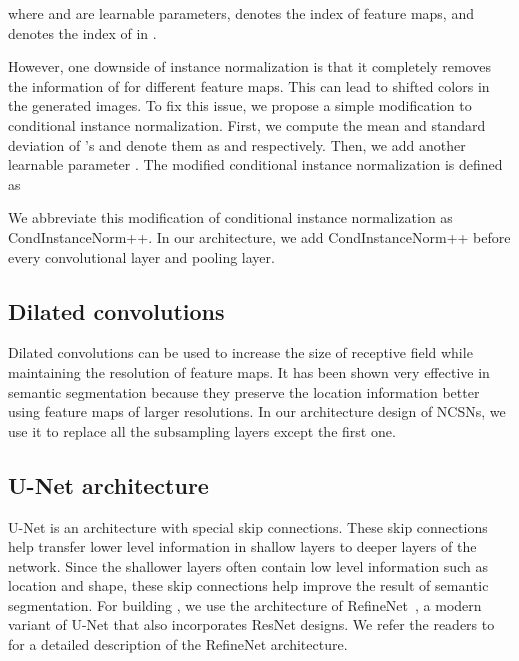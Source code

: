 \documentclass{article}
\begin{document}
where  and  are learnable parameters,  denotes the index of feature maps, and  denotes the index of  in . 

However, one downside of instance normalization is that it completely removes the information of  for different feature maps. This can lead to shifted colors in the generated images. To fix this issue, we propose a simple modification to conditional instance normalization. First, we compute the mean and standard deviation of 's and denote them as  and  respectively. Then, we add another learnable parameter . The modified conditional instance normalization is defined as

We abbreviate this modification of conditional instance normalization as CondInstanceNorm++. In our architecture, we add CondInstanceNorm++ before every convolutional layer and pooling layer.

\subsection{Dilated convolutions}
Dilated convolutions can be used to increase the size of receptive field while maintaining the resolution of feature maps. It has been shown very effective in semantic segmentation because they preserve the location information better using feature maps of larger resolutions. In our architecture design of NCSNs, we use it to replace all the subsampling layers except the first one.

\subsection{U-Net architecture} 
U-Net is an architecture with special skip connections. These skip connections help transfer lower level information in shallow layers to deeper layers of the network. Since the shallower layers often contain low level information such as location and shape, these skip connections help improve the result of semantic segmentation. For building , we use the architecture of RefineNet~\cite{lin2017refinenet}, a modern variant of U-Net that also incorporates ResNet designs. We refer the readers to \cite{lin2017refinenet} for a detailed description of the RefineNet architecture.
\end{document}
